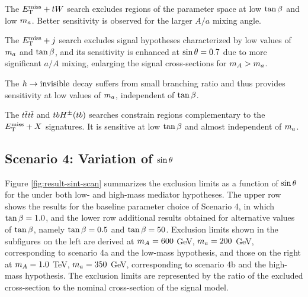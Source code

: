 The $E_{\mathrm{T}}^{\mathrm{miss}}+tW$ search excludes regions of the parameter space at low $\tan\beta$ and low $m_a$. Better sensitivity is observed for the larger $A/a$ mixing angle. 

The $E_{\mathrm{T}}^{\mathrm{miss}}+j$ search excludes signal hypotheses characterized by low values of $m_a$ and $\tan\beta$, and its sensitivity is enhanced at $\sin\theta=0.7$ due to more significant $a/A$ mixing, enlarging the signal cross-sections for $m_A>m_a$. 

The $h\rightarrow \mathrm{invisible}$ decay suffers from small branching ratio and thus provides sensitivity at low values of $m_a$, independent of $\tan\beta$.

The $t\bar{t}t\bar{t}$ and $tbH^{\pm}(tb)$ searches constrain regions complementary to the $E_{\mathrm{T}}^{\mathrm{miss}}+X$ signatures. It is sensitive at low $\tan\beta$ and almost independent of $m_a$.

\subsection{Scenario 4: Variation of \texorpdfstring{$\sin\theta$}{TEXT}}

Figure \ref{fig:result-sint-scan} summarizes the exclusion limits as a function of $\sin\theta$ for the \thdma under both low- and high-mass mediator hypotheses. 
The upper row shows the results for the baseline parameter choice of Scenario 4, in which $\tan\beta=1.0$, and the lower row additional results obtained for alternative values of $\tan\beta$, namely $\tan\beta=0.5$ and $\tan\beta=50$. 
Exclusion limits shown in the subfigures on the left are derived at $m_A=600$ GeV, $m_a=200$ GeV, 
corresponding to scenario 4a and the low-mass hypothesis, and those on the right at $m_A=1.0$ TeV, 
$m_a=350$ GeV, corresponding to scenario 4b and the high-mass hypothesis. 
The exclusion limits are represented by the ratio of the excluded cross-section to the nominal cross-section of the signal model.

